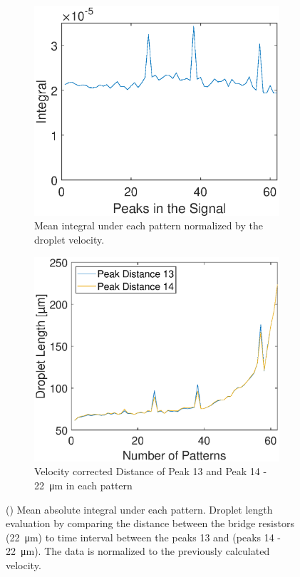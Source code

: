 \begin{figure}[h]
	\vspace{-10px}
	\begin{subfigure}[l]{0.49\textwidth} 
		\centering
		\includegraphics[clip,trim={0mm 0mm 0mm 0mm}, width=1.1\linewidth]{Ressourcen/Results/Measurement/Int.eps}
		\caption{Mean integral under each pattern normalized by the droplet velocity.}
		\label{fig:exp:pattern:integral}
	\end{subfigure}
	\hfill
	\begin{subfigure}[r]{0.49\textwidth} 
		\centering
		\includegraphics[clip,trim={0mm 0mm 0mm 0mm}, width=\linewidth]{Ressourcen/Results/Measurement/13_14_abs}
		\caption{Velocity corrected Distance of Peak 13 and Peak 14 - \SI{22}{\micro\meter} in each pattern}
		\label{fig:exp:pattern:13}
	\end{subfigure}
	\caption{(\protect{}) Mean absolute integral under each pattern. Droplet length evaluation by comparing the distance between the bridge resistors (\SI{22}{\micro\meter}) to time interval between the peaks 13 and (peaks 14 - \SI{22}{\micro\meter}). The data is normalized to the previously calculated velocity.}
\end{figure}
